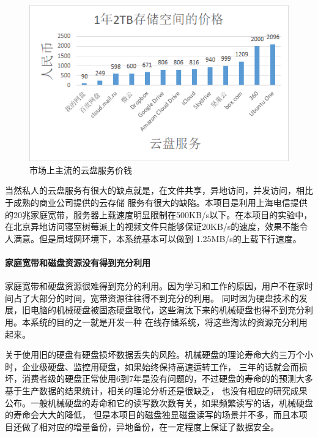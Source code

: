 \begin{figure}[H]
  \centering
  \includegraphics[width=130mm]{./figures/cloud_price.png}
  \caption{市场上主流的云盘服务价钱\cite{r11,r12,r13,r14,r22,r23}}
\end{figure}

当然私人的云盘服务有很大的缺点就是，在文件共享，异地访问，并发访问，相比于成熟的商业公司提供的云存储
服务有很大的缺陷。本项目是利用上海电信提供的20兆家庭宽带，服务器上载速度明显限制在500KB/s以下。在本项目的实验中，
在北京异地访问寝室树莓派上的视频文件只能够保证20KB/s的速度，效果不能令人满意。但是局域网环境下，本系统基本可以做到
1.25MB/s的上载下行速度。

\paragraph{家庭宽带和磁盘资源没有得到充分利用}
家庭宽带和硬盘资源很难得到充分的利用。因为学习和工作的原因，用户不在家时间占了大部分的时间，宽带资源往往得不到充分的利用。
同时因为硬盘技术的发展，旧电脑的机械硬盘被固态硬盘取代，这些淘汰下来的机械硬盘也得不到充分利用。本系统的目的之一就是开发一种
在线存储系统，将这些淘汰的资源充分利用起来。

关于使用旧的硬盘有硬盘损坏数据丢失的风险。机械硬盘的理论寿命大约三万个小时，企业级硬盘、监控用硬盘，如果始终保持高速运转工作，
三年的话就会而损坏，消费者级的硬盘正常使用6到7年是没有问题的，不过硬盘的寿命的的预测大多基于生产数据的结果统计，相关的理论分析还是很缺乏，
也没有相应的研究成果公布\cite{r24}。一般机械硬盘的寿命和它的读写数次数有关，如果频繁读写的话，机械硬盘的寿命会大大的降低，
但是本项目的磁盘独显磁盘读写的场景并不多，而且本项目还做了相对应的增量备份，异地备份，在一定程度上保证了数据安全。

